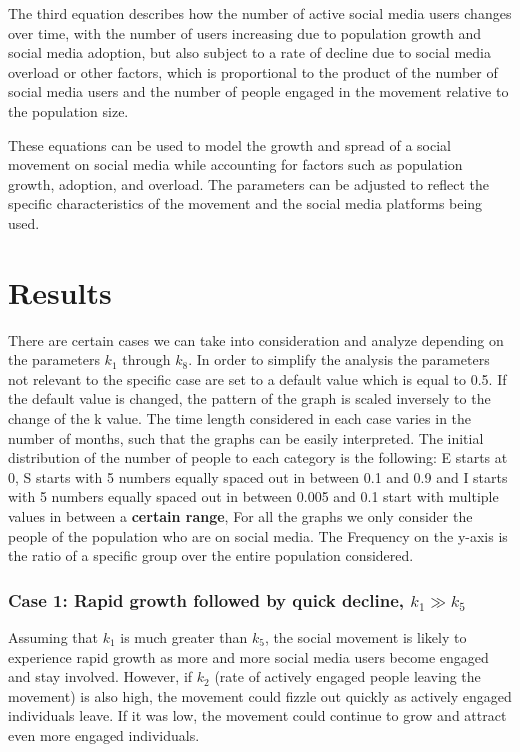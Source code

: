 \documentclass{article}
\begin{document}
	The third equation describes how the number of active social media users changes over time, with the number of users increasing due to population growth and social media adoption, but also subject to a rate of decline due to social media overload or other factors, which is proportional to the product of the number of social media users and the number of people engaged in the movement relative to the population size. 
 
	These equations can be used to model the growth and spread of a social movement on social media while accounting for factors such as population growth, adoption, and overload. The parameters can be adjusted to reflect the specific characteristics of the movement and the social media platforms being used.
 

    \section{Results}
    
    There are certain cases we can take into consideration and analyze depending on the parameters $k_1$ through $k_8$. In order to simplify the analysis the parameters not relevant to the specific case are set to a default value which is equal to 0.5. If the default value is changed, the pattern of the graph is scaled inversely to the change of the k value.
    The time length considered in each case varies in the number of months, such that the graphs can be easily interpreted. The initial distribution of the number of people to each category is the following: E starts at 0, S starts with 5 numbers equally spaced out in between 0.1 and 0.9 and I starts with 5 numbers equally spaced out in between 0.005 and 0.1 start with multiple values in between a \textbf{certain range}, 
    For all the graphs we only consider the people of the population who are on social media. The Frequency on the y-axis is the ratio of a specific group over the entire population considered.


    \subsubsection*{Case 1: Rapid growth followed by quick decline, $k_1 \gg k_5$} \normalfont
    Assuming that $k_1$  is much greater than $k_5$, the social movement is likely to experience rapid growth as more and more social media users become engaged and stay involved. However, if $k_2$ (rate of actively engaged people leaving the movement) is also high, the movement could fizzle out quickly as actively engaged individuals leave. If it was low, the movement could continue to grow and attract even more engaged individuals.
\end{document}
